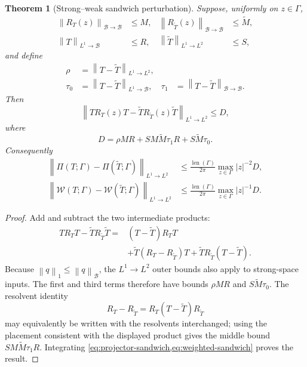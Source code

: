 \documentclass[11pt]{article}
\newtheorem{theorem}{Theorem}[section]
\theoremstyle{remark}
\newcommand{\cB}{\mathcal B}
\newcommand{\cW}{\mathcal W}
\newcommand{\norm}[1]{\left\lVert #1\right\rVert}
\newcommand{\len}{\operatorname{len}}
\begin{document}
\begin{theorem}[Strong--weak sandwich perturbation]
\label{thm:sandwich}
Suppose, uniformly on $z\in\Gamma$,
\begin{align*}
 \norm{R_T(z)}_{\cB\to\cB}&\le M,&
 \norm{R_{\widetilde T}(z)}_{\cB\to\cB}&\le\widetilde M,\\
 \norm T_{L^1\to\cB}&\le R,&
 \norm{\widetilde T}_{L^1\to L^2}&\le S,
\end{align*}
and define
\begin{align*}
 \rho&=\norm{T-\widetilde T}_{L^1\to L^2},\\
 \tau_0&=\norm{T-\widetilde T}_{L^1\to\cB},&
 \tau_1&=\norm{T-\widetilde T}_{\cB\to\cB}.
\end{align*}
Then
\begin{equation}
 \norm{TR_T(z)T-\widetilde T R_{\widetilde T}(z)\widetilde T}_{L^1\to L^2}
 \le D,
 \label{eq:sandwich-defect}
\end{equation}
where
\begin{equation}
 \boxed{D=\rho MR+SM\widetilde M\tau_1R+S\widetilde M\tau_0.}
 \label{eq:D}
\end{equation}
Consequently
\begin{align}
 \norm{\Pi(T;\Gamma)-\Pi(\widetilde T;\Gamma)}_{L^1\to L^2}
 &\le\frac{\len(\Gamma)}{2\pi}
 \max_{z\in\Gamma}|z|^{-2}D,
 \label{eq:projector-defect}\\
 \norm{\cW(T;\Gamma)-\cW(\widetilde T;\Gamma)}_{L^1\to L^2}
 &\le\frac{\len(\Gamma)}{2\pi}
 \max_{z\in\Gamma}|z|^{-1}D.
 \label{eq:weighted-defect}
\end{align}
\end{theorem}

\begin{proof}
Add and subtract the two intermediate products:
\begin{align*}
 TR_TT-\widetilde T R_{\widetilde T}\widetilde T
 ={}&(T-\widetilde T)R_TT\\
 &+\widetilde T(R_T-R_{\widetilde T})T
 +\widetilde T R_{\widetilde T}(T-\widetilde T).
\end{align*}
Because $\norm q_1\le\norm q_{\cB}$, the $L^1\to L^2$ outer bounds also
apply to strong-space inputs.  The first and third terms therefore have
bounds $\rho MR$ and
$S\widetilde M\tau_0$.  The resolvent identity
\[
 R_T-R_{\widetilde T}=R_T(T-\widetilde T)R_{\widetilde T}
\]
may equivalently be written with the resolvents interchanged; using the
placement consistent with the displayed product gives the middle bound
$SM\widetilde M\tau_1R$.  Integrating
\cref{eq:projector-sandwich,eq:weighted-sandwich} proves the result.
\end{proof}
\end{document}
